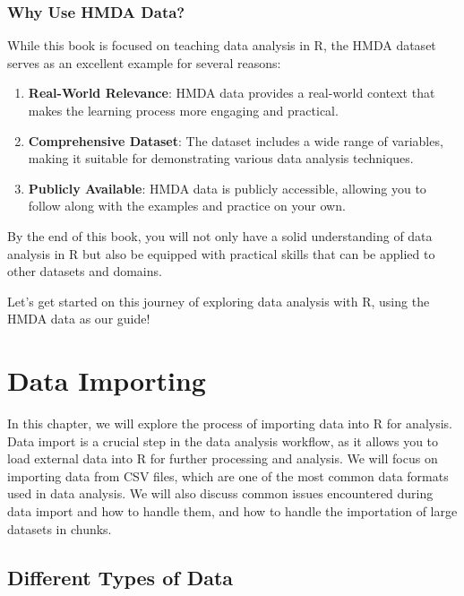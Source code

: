 \documentclass[
]{book}
\providecommand{\tightlist}{%
  \setlength{\itemsep}{0pt}\setlength{\parskip}{0pt}}
\begin{document}
\subsection{Why Use HMDA Data?}\label{why-use-hmda-data}

While this book is focused on teaching data analysis in R, the HMDA dataset serves as an excellent example for several reasons:

\begin{enumerate}
\def\labelenumi{\arabic{enumi}.}
\tightlist
\item
  \textbf{Real-World Relevance}: HMDA data provides a real-world context that makes the learning process more engaging and practical.
\item
  \textbf{Comprehensive Dataset}: The dataset includes a wide range of variables, making it suitable for demonstrating various data analysis techniques.
\item
  \textbf{Publicly Available}: HMDA data is publicly accessible, allowing you to follow along with the examples and practice on your own.
\end{enumerate}

By the end of this book, you will not only have a solid understanding of data analysis in R but also be equipped with practical skills that can be applied to other datasets and domains.

Let's get started on this journey of exploring data analysis with R, using the HMDA data as our guide!

\chapter{Data Importing}\label{data-importing}

In this chapter, we will explore the process of importing data into R for analysis. Data import is a crucial step in the data analysis workflow, as it allows you to load external data into R for further processing and analysis. We will focus on importing data from CSV files, which are one of the most common data formats used in data analysis. We will also discuss common issues encountered during data import and how to handle them, and how to handle the importation of large datasets in chunks.

\section{Different Types of Data}\label{different-types-of-data}
\end{document}

